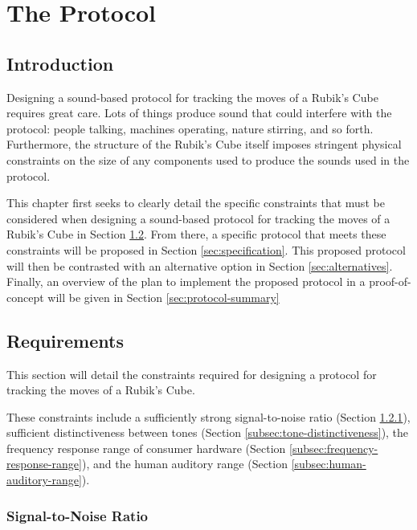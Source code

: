 \chapter{The Protocol} %

\label{Chapter4} %


\section{Introduction}

Designing a sound-based protocol for tracking the moves of a Rubik's
Cube requires great care. Lots of things produce sound that could
interfere with the protocol: people talking, machines operating, nature
stirring, and so forth. Furthermore, the structure of the Rubik's Cube
itself imposes stringent physical constraints on the size of any
components used to produce the sounds used in the protocol.

This chapter first seeks to clearly detail the specific constraints
that must be considered when designing a sound-based protocol for
tracking the moves of a Rubik's Cube in Section
\ref{sec:protocol-requirements}. From there, a specific protocol that
meets these constraints will be proposed in Section
\ref{sec:specification}. This proposed protocol will then be contrasted
with an alternative option in Section \ref{sec:alternatives}. Finally,
an overview of the plan to implement the proposed protocol in a
proof-of-concept will be given in Section \ref{sec:protocol-summary}


\section{Requirements}
\label{sec:protocol-requirements}

This section will detail the constraints required for designing a
protocol for tracking the moves of a Rubik's Cube.

These constraints include a sufficiently strong signal-to-noise ratio
(Section \ref{subsec:signal-to-noise-ratio}), sufficient distinctiveness
between tones (Section \ref{subsec:tone-distinctiveness}), the frequency
response range of consumer hardware
(Section \ref{subsec:frequency-response-range}), and the human auditory range
(Section \ref{subsec:human-auditory-range}).

\subsection{Signal-to-Noise Ratio}
\label{subsec:signal-to-noise-ratio}

